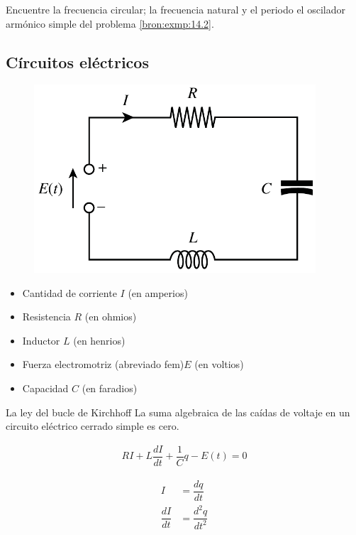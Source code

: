 \begin{resuelto}
	Encuentre la frecuencia circular; la frecuencia natural y el periodo el oscilador arm\'onico simple del problema \ref{bron:exmp:14.2}.
\end{resuelto}



\subsection{Círcuitos eléctricos}


\begin{figure}
	\includegraphics[height=7cm,keepaspectratio=true]{./edo/circuitos_electricos.png}
	\label{fig:circuitos}
\end{figure}



{}
\begin{itemize}
	\item Cantidad de corriente $I$ (en amperios)
	\item Resistencia $R$ (en ohmios)
	\item Inductor $L$ (en henrios)
	\item Fuerza electromotriz (abreviado fem)$E$ (en voltios)
	\item Capacidad $C$ (en faradios)
\end{itemize}


{La ley del bucle de Kirchhoff}
La suma algebraica de las caídas de voltaje en un circuito eléctrico cerrado simple es cero.


{}
\begin{align}
	RI + L\dfrac{dI}{dt}+\dfrac{1}{C}q-E(t)=0
\end{align}


{}
\begin{align}
	I&=\dfrac{dq}{dt}\\
	\dfrac{dI}{dt}&=\dfrac{d^{2}q}{dt^{2}}
\end{align}



